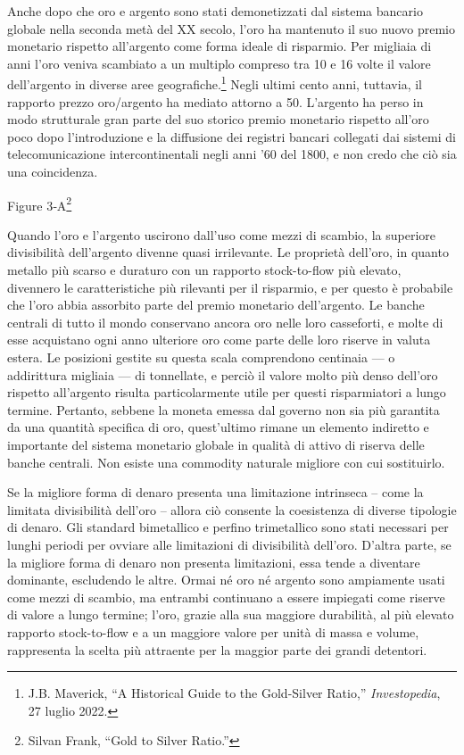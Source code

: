 \documentclass[
  a5paper,
  smalldemyvopaper,10pt,twoside,onecolumn,openright,extrafontsizes,hidelinks]{memoir}
\begin{document}
Anche dopo che oro e argento sono stati demonetizzati dal sistema
bancario globale nella seconda metà del XX secolo, l'oro ha mantenuto il
suo nuovo premio monetario rispetto all'argento come forma ideale di
risparmio. Per migliaia di anni l'oro veniva scambiato a un multiplo
compreso tra 10 e 16 volte il valore dell'argento in diverse aree
geografiche.\footnote{J.B. Maverick, ``A Historical Guide to the
  Gold-Silver Ratio,'' \emph{Investopedia}, 27 luglio 2022.} Negli
ultimi cento anni, tuttavia, il rapporto prezzo oro/argento ha mediato
attorno a 50. L'argento ha perso in modo strutturale gran parte del suo
storico premio monetario rispetto all'oro poco dopo l'introduzione e la
diffusione dei registri bancari collegati dai sistemi di
telecomunicazione intercontinentali negli anni '60 del 1800, e non credo
che ciò sia una coincidenza.

Figure 3‑A\footnote{Silvan Frank, ``Gold to Silver Ratio.''}

Quando l'oro e l'argento uscirono dall'uso come mezzi di scambio, la
superiore divisibilità dell'argento divenne quasi irrilevante. Le
proprietà dell'oro, in quanto metallo più scarso e duraturo con un
rapporto stock-to-flow più elevato, divennero le caratteristiche più
rilevanti per il risparmio, e per questo è probabile che l'oro abbia
assorbito parte del premio monetario dell'argento. Le banche centrali di
tutto il mondo conservano ancora oro nelle loro casseforti, e molte di
esse acquistano ogni anno ulteriore oro come parte delle loro riserve in
valuta estera. Le posizioni gestite su questa scala comprendono
centinaia --- o addirittura migliaia --- di tonnellate, e perciò il
valore molto più denso dell'oro rispetto all'argento risulta
particolarmente utile per questi risparmiatori a lungo termine.
Pertanto, sebbene la moneta emessa dal governo non sia più garantita da
una quantità specifica di oro, quest'ultimo rimane un elemento indiretto
e importante del sistema monetario globale in qualità di attivo di
riserva delle banche centrali. Non esiste una commodity naturale
migliore con cui sostituirlo.

Se la migliore forma di denaro presenta una limitazione intrinseca --
come la limitata divisibilità dell'oro -- allora ciò consente la
coesistenza di diverse tipologie di denaro. Gli standard bimetallico e
perfino trimetallico sono stati necessari per lunghi periodi per ovviare
alle limitazioni di divisibilità dell'oro. D'altra parte, se la migliore
forma di denaro non presenta limitazioni, essa tende a diventare
dominante, escludendo le altre. Ormai né oro né argento sono ampiamente
usati come mezzi di scambio, ma entrambi continuano a essere impiegati
come riserve di valore a lungo termine; l'oro, grazie alla sua maggiore
durabilità, al più elevato rapporto stock-to-flow e a un maggiore valore
per unità di massa e volume, rappresenta la scelta più attraente per la
maggior parte dei grandi detentori.
\end{document}
